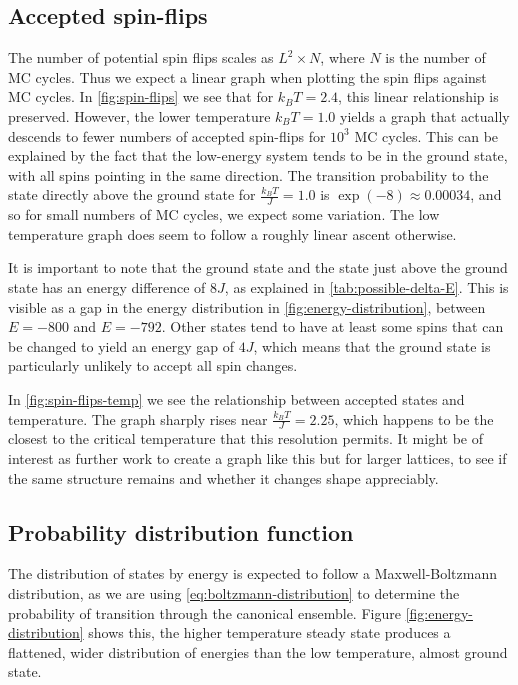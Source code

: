 \documentclass[../main.tex]{subfiles}
\begin{document}
\subsection{Accepted spin-flips}

The number of potential spin flips scales as $L^2 \times N$, where $N$ is the number of MC cycles. Thus we expect a linear graph when plotting the spin flips against MC cycles. In \cref{fig:spin-flips} we see that for $k_B T = 2.4$, this linear relationship is preserved. However, the lower temperature $k_B T = 1.0$ yields a graph that actually descends to fewer numbers of accepted spin-flips for $10^3$ MC cycles. This can be explained by the fact that the low-energy system tends to be in the ground state, with all spins pointing in the same direction. The transition probability to the state directly above the ground state for $\frac{k_B T}{J} = 1.0$ is $\exp(-8) \approx 0.00034$, and so for small numbers of MC cycles, we expect some variation. The low temperature graph does seem to follow a roughly linear ascent otherwise.

It is important to note that the ground state and the state just above the ground state has an energy difference of $8J$, as explained in \cref{tab:possible-delta-E}. This is visible as a gap in the energy distribution in \cref{fig:energy-distribution}, between $E = -800$ and $E = -792$. Other states tend to have at least some spins that can be changed to yield an energy gap of $4J$, which means that the ground state is particularly unlikely to accept all spin changes.

In \cref{fig:spin-flips-temp} we see the relationship between accepted states and temperature. The graph sharply rises near $\frac{k_B T}{J} = 2.25$, which happens to be the closest to the critical temperature that this resolution permits. It might be of interest as further work to create a graph like this but for larger lattices, to see if the same structure remains and whether it changes shape appreciably. 

\subsection{Probability distribution function}

The distribution of states by energy is expected to follow a Maxwell-Boltzmann distribution, as we are using \cref{eq:boltzmann-distribution} to determine the probability of transition through the canonical ensemble. Figure \ref{fig:energy-distribution} shows this, the higher temperature steady state produces a flattened, wider distribution of energies than the low temperature, almost ground state.
\end{document}
